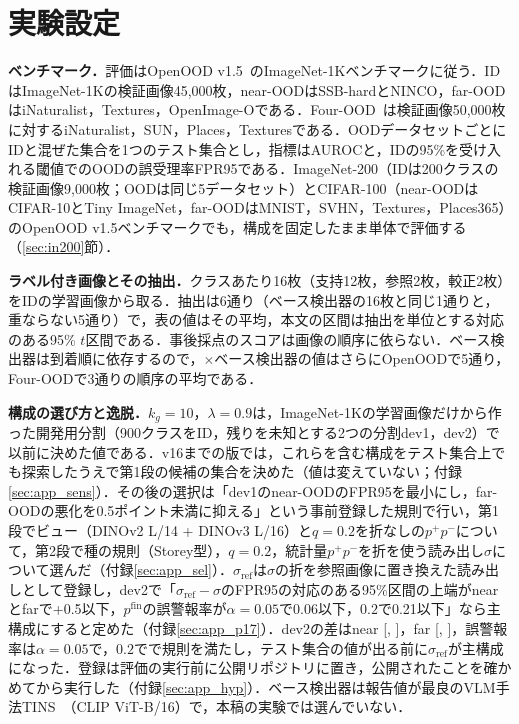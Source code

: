 \documentclass[MIRU,submit]{miru2025j}
\newcommand\secref[1]{\ref{sec:#1}節}
\newcommand\AUC{AUROC}
\newcommand\FPR{FPR95}
\newcommand\pP{p^{+}}
\newcommand\pN{p^{-}}
\newcommand\pfin{p^{\mathrm{fin}}}
\newcommand\sR{\sigma_{\mathrm{ref}}}
\begin{document}


\section{実験設定}
\label{sec:exp}
\textbf{ベンチマーク．}評価はOpenOOD v1.5~\cite{zhang2023openood}のImageNet-1Kベンチマークに従う．IDはImageNet-1Kの検証画像45,000枚，near-OODはSSB-hardとNINCO，far-OODはiNaturalist，Textures，OpenImage-Oである．Four-OOD~\cite{huang2021mos}は検証画像50,000枚に対するiNaturalist，SUN，Places，Texturesである．OODデータセットごとにIDと混ぜた集合を1つのテスト集合とし，指標は\AUC{}と，IDの95\%を受け入れる閾値でのOODの誤受理率\FPR{}である．ImageNet-200（IDは200クラスの検証画像9,000枚；OODは同じ5データセット）とCIFAR-100（near-OODはCIFAR-10とTiny ImageNet，far-OODはMNIST，SVHN，Textures，Places365）のOpenOOD v1.5ベンチマークでも，構成を固定したまま単体で評価する（\secref{in200}）．

\textbf{ラベル付き画像とその抽出．}クラスあたり16枚（支持12枚，参照2枚，較正2枚）をIDの学習画像から取る．抽出は6通り（ベース検出器の16枚と同じ1通りと，重ならない5通り）で，表の値はその平均，本文の区間は抽出を単位とする対応のある95\% $t$区間である．事後採点のスコアは画像の順序に依らない．ベース検出器は到着順に依存するので，$\times$ベース検出器の値はさらにOpenOODで5通り，Four-OODで3通りの順序の平均である．

\textbf{構成の選び方と逸脱．}$k_g{=}10$，$\lambda{=}0.9$は，ImageNet-1Kの学習画像だけから作った開発用分割（900クラスをID，残りを未知とする2つの分割dev1，dev2）で以前に決めた値である．v16までの版では，これらを含む構成をテスト集合上でも探索したうえで第1段の候補の集合を決めた（値は変えていない；付録\ref{sec:app_sens}）．その後の選択は「dev1のnear-OODの\FPR{}を最小にし，far-OODの悪化を0.5ポイント未満に抑える」という事前登録した規則で行い，第1段でビュー（DINOv2 L/14 + DINOv3 L/16）と$q{=}0.2$を折なしの$\pP\pN$について，第2段で種の規則（Storey型），$q{=}0.2$，統計量$\pP\pN$を折を使う読み出し$\sigma$について選んだ（付録\ref{sec:app_sel}）．$\sR$は$\sigma$の折を参照画像に置き換えた読み出しとして登録し，dev2で「$\sR-\sigma$の\FPR{}の対応のある95\%区間の上端がnearとfarで+0.5以下，$\pfin$の誤警報率が$\alpha{=}0.05$で0.06以下，$0.2$で0.21以下」なら主構成にすると定めた（付録\ref{sec:app_p17}）．dev2の差はnear \NRDevTwoNearD{} [\NRDevTwoNearDLo, \NRDevTwoNearDHi]，far \NRDevTwoFarD{} [\NRDevTwoFarDLo, \NRDevTwoFarDHi]，誤警報率は$\alpha{=}0.05$で\NRDevTwoFprFive{}，$0.2$で\NRDevTwoFprTwenty{}で規則を満たし，テスト集合の値が出る前に$\sR$が主構成になった．登録は評価の実行前に公開リポジトリに置き，公開されたことを確かめてから実行した（付録\ref{sec:app_hyp}）．ベース検出器は報告値が最良のVLM手法TINS~\cite{yang2026tins}（CLIP ViT-B/16）で，本稿の実験では選んでいない．
\end{document}
